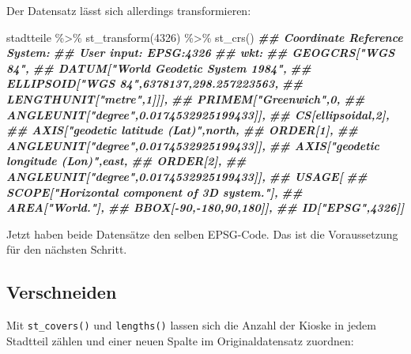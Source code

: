 \documentclass[
  ngerman,
]{article}
\newenvironment{Shaded}{\begin{snugshade}}{\end{snugshade}}
\newcommand{\DecValTok}[1]{\textcolor[rgb]{0.00,0.00,0.81}{#1}}
\newcommand{\DocumentationTok}[1]{\textcolor[rgb]{0.56,0.35,0.01}{\textbf{\textit{#1}}}}
\newcommand{\FunctionTok}[1]{\textcolor[rgb]{0.00,0.00,0.00}{#1}}
\newcommand{\NormalTok}[1]{#1}
\newcommand{\OtherTok}[1]{\textcolor[rgb]{0.56,0.35,0.01}{#1}}
\newcommand{\SpecialCharTok}[1]{\textcolor[rgb]{0.00,0.00,0.00}{#1}}
\begin{document}
Der Datensatz lässt sich allerdings transformieren:

\begin{Shaded}
\begin{Highlighting}[]
\NormalTok{stadtteile }\SpecialCharTok{\%\textgreater{}\%}
  \FunctionTok{st\_transform}\NormalTok{(}\DecValTok{4326}\NormalTok{) }\SpecialCharTok{\%\textgreater{}\%}
  \FunctionTok{st\_crs}\NormalTok{()}
\DocumentationTok{\#\# Coordinate Reference System:}
\DocumentationTok{\#\#   User input: EPSG:4326 }
\DocumentationTok{\#\#   wkt:}
\DocumentationTok{\#\# GEOGCRS["WGS 84",}
\DocumentationTok{\#\#     DATUM["World Geodetic System 1984",}
\DocumentationTok{\#\#         ELLIPSOID["WGS 84",6378137,298.257223563,}
\DocumentationTok{\#\#             LENGTHUNIT["metre",1]]],}
\DocumentationTok{\#\#     PRIMEM["Greenwich",0,}
\DocumentationTok{\#\#         ANGLEUNIT["degree",0.0174532925199433]],}
\DocumentationTok{\#\#     CS[ellipsoidal,2],}
\DocumentationTok{\#\#         AXIS["geodetic latitude (Lat)",north,}
\DocumentationTok{\#\#             ORDER[1],}
\DocumentationTok{\#\#             ANGLEUNIT["degree",0.0174532925199433]],}
\DocumentationTok{\#\#         AXIS["geodetic longitude (Lon)",east,}
\DocumentationTok{\#\#             ORDER[2],}
\DocumentationTok{\#\#             ANGLEUNIT["degree",0.0174532925199433]],}
\DocumentationTok{\#\#     USAGE[}
\DocumentationTok{\#\#         SCOPE["Horizontal component of 3D system."],}
\DocumentationTok{\#\#         AREA["World."],}
\DocumentationTok{\#\#         BBOX[{-}90,{-}180,90,180]],}
\DocumentationTok{\#\#     ID["EPSG",4326]]}
\end{Highlighting}
\end{Shaded}

Jetzt haben beide Datensätze den selben EPSG-Code. Das ist die Voraussetzung für den nächsten Schritt.

\hypertarget{verschneiden}{%
\subsection{Verschneiden}\label{verschneiden}}

Mit \texttt{st\_covers()} und \texttt{lengths()} lassen sich die Anzahl der Kioske in jedem Stadtteil zählen und einer neuen Spalte im Originaldatensatz zuordnen:

\begin{Shaded}
\end{Shaded}
\end{document}
